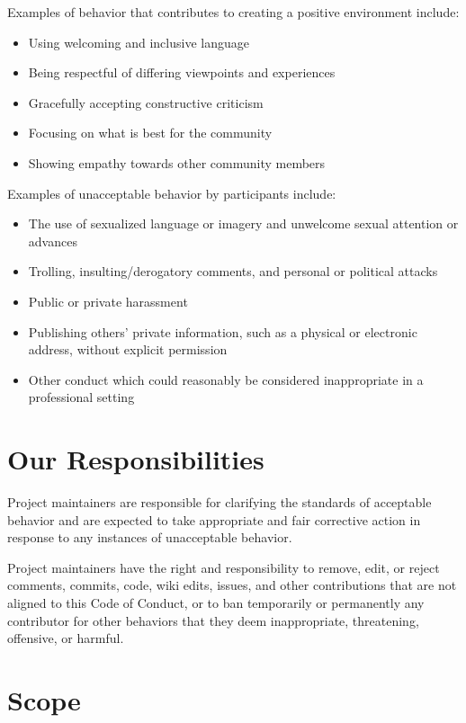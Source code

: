 \documentclass[
  letterpaper,
  oneside,
  open=any]{scrbook}
\providecommand{\tightlist}{%
  \setlength{\itemsep}{0pt}\setlength{\parskip}{0pt}}\usepackage{longtable,booktabs,array}
\begin{document}
Examples of behavior that contributes to creating a positive environment
include:

\begin{itemize}
\tightlist
\item
  Using welcoming and inclusive language
\item
  Being respectful of differing viewpoints and experiences
\item
  Gracefully accepting constructive criticism
\item
  Focusing on what is best for the community
\item
  Showing empathy towards other community members
\end{itemize}

Examples of unacceptable behavior by participants include:

\begin{itemize}
\tightlist
\item
  The use of sexualized language or imagery and unwelcome sexual
  attention or advances
\item
  Trolling, insulting/derogatory comments, and personal or political
  attacks
\item
  Public or private harassment
\item
  Publishing others' private information, such as a physical or
  electronic address, without explicit permission
\item
  Other conduct which could reasonably be considered inappropriate in a
  professional setting
\end{itemize}

\section{Our Responsibilities}\label{our-responsibilities}

Project maintainers are responsible for clarifying the standards of
acceptable behavior and are expected to take appropriate and fair
corrective action in response to any instances of unacceptable behavior.

Project maintainers have the right and responsibility to remove, edit,
or reject comments, commits, code, wiki edits, issues, and other
contributions that are not aligned to this Code of Conduct, or to ban
temporarily or permanently any contributor for other behaviors that they
deem inappropriate, threatening, offensive, or harmful.

\section{Scope}\label{scope}
\end{document}
